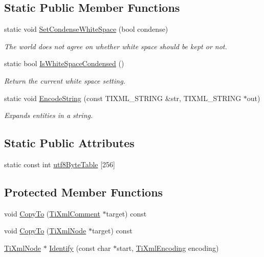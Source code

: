 \subsection*{Static Public Member Functions}
\begin{DoxyCompactItemize}
\item 
static void \hyperlink{classTiXmlBase_a0f799ec645bfb8d8a969e83478f379c1}{SetCondenseWhiteSpace} (bool condense)
\begin{DoxyCompactList}\small\item\em The world does not agree on whether white space should be kept or not. \item\end{DoxyCompactList}\item 
static bool \hyperlink{classTiXmlBase_ad4b1472531c647a25b1840a87ae42438}{IsWhiteSpaceCondensed} ()
\begin{DoxyCompactList}\small\item\em Return the current white space setting. \item\end{DoxyCompactList}\item 
static void \hyperlink{classTiXmlBase_a32ed202562b58de64c7d799ca3c9db98}{EncodeString} (const TIXML\_\-STRING \&str, TIXML\_\-STRING $\ast$out)
\begin{DoxyCompactList}\small\item\em Expands entities in a string. \item\end{DoxyCompactList}\end{DoxyCompactItemize}
\subsection*{Static Public Attributes}
\begin{DoxyCompactItemize}
\item 
static const int \hyperlink{classTiXmlBase_ac8c86058137bdb4b413c3eca58f2d467}{utf8ByteTable} \mbox{[}256\mbox{]}
\end{DoxyCompactItemize}
\subsection*{Protected Member Functions}
\begin{DoxyCompactItemize}
\item 
void \hyperlink{classTiXmlComment_a3175b2f27628f4fb7a043897930cd934}{CopyTo} (\hyperlink{classTiXmlComment}{TiXmlComment} $\ast$target) const 
\item 
void \hyperlink{classTiXmlNode_ab6056978923ad8350fb5164af32d8038}{CopyTo} (\hyperlink{classTiXmlNode}{TiXmlNode} $\ast$target) const 
\item 
\hyperlink{classTiXmlNode}{TiXmlNode} $\ast$ \hyperlink{classTiXmlNode_ac1e3a8e7578be463b04617786120c2bb}{Identify} (const char $\ast$start, \hyperlink{tinyxml_8h_a88d51847a13ee0f4b4d320d03d2c4d96}{TiXmlEncoding} encoding)
\end{DoxyCompactItemize}
